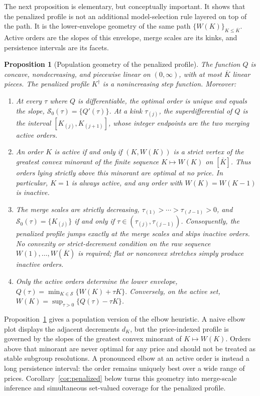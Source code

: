 \documentclass[11pt]{article}
\newtheorem{proposition}{Proposition}
\newcommand{\calS}{\mathcal S}
\begin{document}
The next proposition is elementary, but conceptually important.  It shows that the penalized profile is not an additional model-selection rule layered on top of the path.  It is the lower-envelope geometry of the same path $\{W(K)\}_{K\le\overline K}$.  Active orders are the slopes of this envelope, merge scales are its kinks, and persistence intervals are its facets.

\begin{proposition}[Population geometry of the penalized profile]\label{prop:envelope}
The function $Q$ is concave, nondecreasing, and piecewise linear on $(0,\infty)$, with at most $\overline K$ linear pieces.  The penalized profile $K^\dagger$ is a nonincreasing step function.  Moreover:
\begin{enumerate}[label=(\roman*),leftmargin=2em]
\item At every $\tau$ where $Q$ is differentiable, the optimal order is unique and equals the slope, $\calS_0(\tau)=\{Q'(\tau)\}$.
At a kink $\tau_{(j)}$, the superdifferential of $Q$ is the interval $[K_{(j)},K_{(j+1)}]$, whose integer endpoints are the two merging active orders.

\item An order $K$ is active if and only if $(K,W(K))$ is a strict vertex of the greatest convex minorant of the finite sequence $K\mapsto W(K)$ on $[\overline K]$.  Thus orders lying strictly above this minorant are optimal at no price.  In particular, $K=1$ is always active, and any order with $W(K)=W(K-1)$ is inactive.

\item The merge scales are strictly decreasing, $\tau_{(1)}>\cdots>\tau_{(J-1)}>0$,
and $\calS_0(\tau)=\{K_{(j)}\}$ if and only if $\tau\in(\tau_{(j)},\tau_{(j-1)})$.
Consequently, the penalized profile jumps exactly at the merge scales and skips inactive orders.  No convexity or strict-decrement condition on the raw sequence $W(1),\dots,W(\overline K)$ is required; flat or nonconvex stretches simply produce inactive orders.

\item Only the active orders determine the lower envelope, $Q(\tau)=\min_{K\in\calS}\{W(K)+\tau K\}.$
Conversely, on the active set, $W(K)=\sup_{\tau>0}\{Q(\tau)-\tau K\}$.
\end{enumerate}
\end{proposition}

Proposition~\ref{prop:envelope} gives a population version of the elbow heuristic.  A naive elbow plot displays the adjacent decrements $d_K$, but the price-indexed profile is governed by the slopes of the greatest convex minorant of $K\mapsto W(K)$.  Orders above that minorant are never optimal for any price and should not be treated as stable subgroup resolutions.  A pronounced elbow at an active order is instead a long persistence interval: the order remains uniquely best over a wide range of prices.  Corollary~\ref{cor:penalized} below turns this geometry into merge-scale inference and simultaneous set-valued coverage for the penalized profile.
\end{document}
